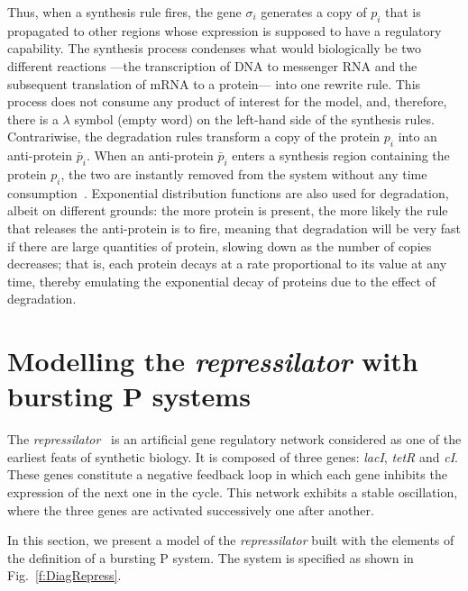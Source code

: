 \documentclass[runningheads,a4paper]{llncs}
\begin{document}
  Thus, when a synthesis rule fires, the gene $\sigma_i$ generates a copy of
  $p_i$ that is propagated to other regions whose expression is supposed to
  have a regulatory capability. The synthesis process condenses what would
  biologically be two different reactions ---the transcription of DNA to
  messenger RNA and the subsequent translation of mRNA to a protein--- into one
  rewrite rule. This process does not consume any product of interest for the
  model, and, therefore, there is a $\lambda$ symbol (empty word) on the
  left-hand side of the synthesis rules. Contrariwise, the degradation rules
  transform a copy of the protein $p_i$ into an anti-protein $\bar{p}_i$. When
  an anti-protein $\bar{p}_i$ enters a synthesis region containing the protein
  $p_i$, the two are instantly removed from the system without any time
  consumption~\cite{Pan2009}.
  Exponential distribution functions are also used
  for degradation, albeit on different grounds: the more protein is present,
  the more likely the rule that releases the anti-protein is to fire, meaning
  that degradation will be very fast if there are large quantities of protein,
  slowing down as the number of copies decreases; that is, each protein decays
  at a rate proportional to its value at any time, thereby emulating the
  exponential decay of proteins due to the effect of degradation.


  
  \section{Modelling the \textit{repressilator} with bursting P systems}
    The \emph{repressilator}~\cite{Elowitz2000} is an artificial gene
    regulatory network considered as one of the earliest feats of synthetic
    biology. It is composed of three genes: \textit{lacI}, \textit{tetR} and
    \textit{cI}. These genes constitute a negative feedback loop in which each
    gene inhibits the expression of the next one in the cycle. This network
    exhibits a stable oscillation, where the three genes are activated
    successively one after another.

    In this section, we present a model of the \emph{repressilator} built with
    the elements of the definition of a bursting P system. The system is
    specified as shown in Fig.~\ref{f:DiagRepress}.
\end{document}
